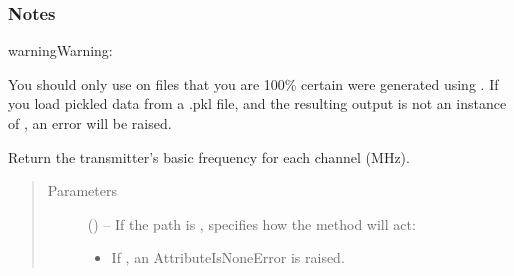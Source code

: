 \documentclass[letterpaper,10pt,english]{sphinxmanual}
\begin{document}
\begin{fulllineitems}
\begin{fulllineitems}
\subsubsection*{Notes}

\begin{sphinxadmonition}{warning}{Warning:}
\sphinxAtStartPar
{}

\sphinxAtStartPar
{}

\sphinxAtStartPar
You should only use {\hyperref[\detokenize{references/core:nmrespy.core.Estimator.from_pickle}]{}} on files that
you are 100\% certain were generated using
{\hyperref[\detokenize{references/core:nmrespy.core.Estimator.to_pickle}]{}}. If you load pickled data from a .pkl file,
and the resulting output is not an instance of
{\hyperref[\detokenize{references/core:nmrespy.core.Estimator}]{}}, an error will be raised.
\end{sphinxadmonition}

\end{fulllineitems}


\begin{fulllineitems}
\label{\detokenize{references/core:nmrespy.core.Estimator.get_bf}}
\sphinxAtStartPar
Return the transmitter’s basic frequency for each channel (MHz).
\begin{quote}\begin{description}
\item[{Parameters}] \leavevmode
\sphinxAtStartPar
{} (\sphinxstyleliteralemphasis{\sphinxupquote{, }}) – 
\sphinxAtStartPar
If the path is ,  specifies how the method will act:
\begin{itemize}
\item {} 
\sphinxAtStartPar
If , an AttributeIsNoneError is raised.


\end{itemize}
\end{description}
\end{quote}
\end{fulllineitems}
\end{fulllineitems}
\end{document}
